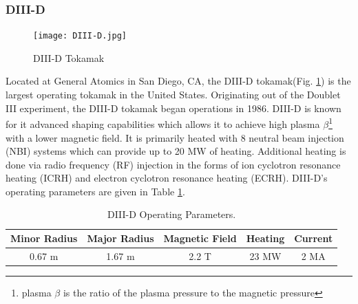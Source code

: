 \subsubsection{DIII-D}
\begin{figure}[ht]
    \centering
    \texttt{[image: DIII-D.jpg]}
    \caption{DIII-D Tokamak}
    \label{fig:d3d}
\end{figure}
Located at General Atomics in San Diego, CA, the DIII-D tokamak(Fig. \ref{fig:d3d}) is the largest operating tokamak in the United States\cite{luxon2002design}.
Originating out of the Doublet III experiment, the DIII-D tokamak began operations in 1986. DIII-D is known for it advanced shaping capabilities which allows it to achieve high plasma $\beta$\footnote{plasma $\beta$ is the ratio of the plasma pressure to the magnetic pressure} with a lower magnetic field. It is primarily heated with 8 neutral beam injection (NBI) systems which can provide up to 20 MW of heating. Additional heating is done via radio frequency (RF) injection in the forms of ion cyclotron resonance heating (ICRH) and electron cyclotron resonance heating (ECRH). DIII-D's operating parameters are given in Table \ref{tab:d3d}.
\begin{table}[h!]
    \centering
    \caption{DIII-D Operating Parameters\cite{luxon2002design}.}
    \label{tab:d3d}
    \begin{tabular}{ccccc}
        \textbf{Minor Radius} & \textbf{Major Radius} & \textbf{Magnetic Field} & \textbf{Heating} & \textbf{Current} \\ \hline \hline
        0.67 m & 1.67 m & 2.2 T & 23 MW & 2 MA \\ \hline
    \end{tabular}
\end{table}

